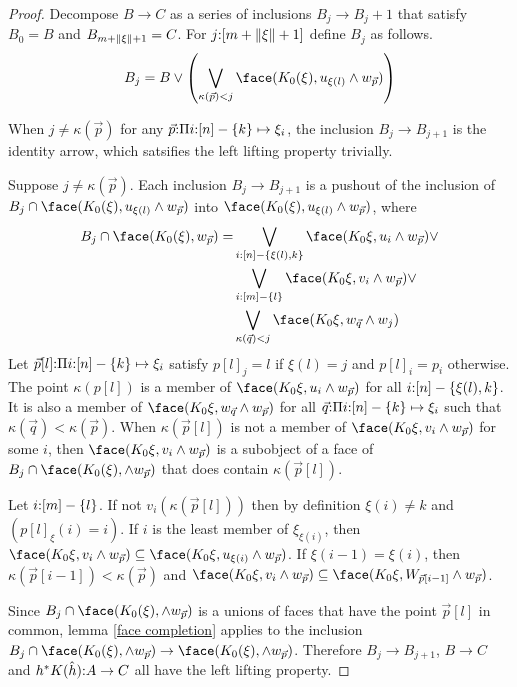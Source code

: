 \documentclass[csh.tex]{subfiles}
\begin{document}
\begin{proof}
Decompose $B\to C$ as a series of inclusions $B_j\to B_j+1$ that satisfy $B_0=B$ and $B_{m+\Vert \xi \Vert+1}=C$. For $j\mathord :[m+\Vert \xi \Vert+1]$ define $B_j$ as follows.
\[ B_j = B \vee \left(\bigvee_{\kappa(\vec p)<j} \face(K_0(\xi),u_{\xi(l)}\land w_{\vec p})\right)\]

When $j\neq\kappa(\vec p)$ for any $\vec p \mathord : \Pi i\mathord : [n]-\left\{k\right\} \mapsto{\xi_i}$, the inclusion $B_j\to B_{j+1}$ is the identity arrow, which satsifies the left lifting property trivially. 

Suppose $j\neq\kappa(\vec p)$. Each inclusion $B_j\to B_{j+1}$ is a pushout of the inclusion of $B_j\cap \face(K_0(\xi),u_{\xi(l)}\land w_{\vec p})$ into $\face(K_0(\xi),u_{\xi(l)}\land w_{\vec p})$, where
\begin{align*} B_j\cap \face(K_0(\xi),w_{\vec p}) = 
&\bigvee_{i\of [n]-\set{\xi(l),k}}\face(K_0\xi,u_i\land w_{\vec p})\vee\\
&\bigvee_{i\of [m]-\set l} \face(K_0\xi,v_i\land w_{\vec p})\vee\\
&\bigvee_{\kappa(\vec q)<j} \face(K_0\xi,w_{\vec q}\land w_j)
\end{align*}
Let $\vec p[l]\mathord : \Pi i\mathord : [n]-\left\{k\right\} \mapsto{\xi_i}$ satisfy $p[l]_j = l$ if $\xi(l)=j$ and $p[l]_i=p_i$ otherwise. The point $\kappa(p[l])$ is a member of $\face(K_0\xi,u_i\land w_{\vec p})$ for all $i\mathord : [n]-\left\{\xi(l),k\right\}$. It is also a member of $\face(K_0\xi,w_{\vec q}\land w_{\vec p})$ for all $\vec q\mathord : \Pi i\mathord : [n]-\left\{k\right\} \mapsto{\xi_i}$ such that $\kappa(\vec q)<\kappa(\vec p)$. When $\kappa(\vec p[l])$ is not a member of $\face(K_0\xi,v_i\land w_{\vec p})$ for some $i$, then $\face(K_0\xi,v_i\land w_{\vec p})$ is a subobject of a face of $B_j\cap \face(K_0(\xi),\land w_{\vec p})$ that does contain $\kappa(\vec p[l])$.

Let $i\mathord :[m]-\left\{l\right\}$. If not $v_i(\kappa(\vec p[l]))$ then by definition $\xi(i)\neq k$ and $(p[l]_\xi(i) = i)$. If $i$ is the least member of $\xi_{\xi(i)}$, then $\face(K_0\xi,v_i\land w_{\vec p})\subseteq \face(K_0\xi,u_{\xi(i)}\land w_{\vec p})$. If $\xi(i-1)=\xi(i)$, then $\kappa(\vec p[i-1])<\kappa(\vec p)$ and $\face(K_0\xi,v_i\land w_{\vec p})\subseteq \face(K_0\xi,W_{\vec p[i-1]}\land w_{\vec p})$.

Since $B_j\cap \face(K_0(\xi),\land w_{\vec p})$ is a unions of faces that have the point $\vec p[l]$ in common, lemma \ref{face completion} applies to the inclusion $B_j\cap \face(K_0(\xi),\land w_{\vec p})\to \face(K_0(\xi),\land w_{\vec p})$. Therefore $B_j\to B_{j+1}$, $B\to C$ and $h^* K(\hat h)\mathord : A\to C$ all have the left lifting property.
\end{proof}
\end{document}
